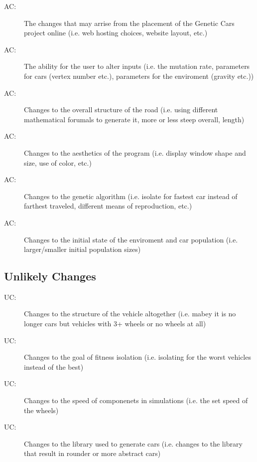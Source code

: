 \documentclass[12pt, titlepage]{article}
\newcounter{acnum}
\newcommand{\actheacnum}{AC\theacnum}
\newcounter{ucnum}
\newcommand{\uctheucnum}{UC\theucnum}
\begin{document}
\begin{description}
\item[ \actheacnum \label{acWebsite}:] The changes that may arrise from the placement of the Genetic Cars project online (i.e. web hosting choices, website layout, etc.) 
\item[ \actheacnum \label{acUserInput}:] The ability for the user to alter inputs (i.e. the mutation rate, parameters for cars (vertex number etc.), parameters for the enviroment (gravity etc.)) 
\item[ \actheacnum \label{acRoad}:] Changes to the overall structure of the road (i.e. using different mathematical forumals to generate it, more or less steep overall, length)
\item[ \actheacnum \label{acAesthetics}:] Changes to the aesthetics of the program (i.e. display window shape and size, use of color, etc.)
\item[ \actheacnum \label{acGeneticAlgorithm}:] Changes to the genetic algorithm (i.e. isolate for fastest car instead of farthest traveled, different means of reproduction, etc.)
\item[ \actheacnum \label{acInitialFactors}:] Changes to the initial state of the enviroment and car population (i.e. larger/smaller initial population sizes)
\end{description}

\subsection{Unlikely Changes} \label{SecUchange}

\begin{description}
\item[ \uctheucnum \label{ucVehicleChange}:] Changes to the structure of the vehicle altogether (i.e. mabey it is no longer cars but vehicles with 3+ wheels or no wheels at all)
\item[ \uctheucnum \label{ucFitnessRequirements}:] Changes to the goal of fitness isolation (i.e. isolating for the worst vehicles instead of the best)
\item[ \uctheucnum \label{ucCarSpeed}:] Changes to the speed of componenets in simulations (i.e. the set speed of the wheels)
\item[ \uctheucnum \label{ucLibrary}:] Changes to the library used to generate cars (i.e. changes to the library that result in rounder or more abstract cars)
\end{description}
\end{document}
